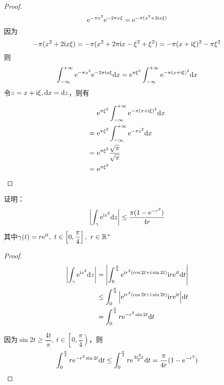 \begin{proof}

    $$\mathrm{e}^{-\pi x^2}\mathrm{e}^{-2\pi x\xi} = \mathrm{e}^{-\pi(x^2 + 2\mathrm{i} x\xi)}$$
    因为
    $$-\pi(x^2 + 2\mathrm{i} x\xi) = -\pi (x^2 + 2\pi\mathrm{i} x - \xi^2 + \xi^2) = -\pi(x + \mathrm{i} \xi)^2 - \pi\xi^2$$
    则
    $$\int_{-\infty}^{+\infty}{\mathrm{e}^{-\pi x^2}\mathrm{e}^{-2\pi \mathrm{i} x\xi}}\mathrm{d} x = \mathrm{e}^{\pi\xi^2} \int_{-\infty}^{+\infty}{\mathrm{e}^{-\pi (x+\mathrm{i}\xi)^2}}\mathrm{d} x$$
    令$z = x + \mathrm{i}\xi, \mathrm{d} x = \mathrm{d} z$，则有

    \begin{align*}
        &\mathrm{e}^{\pi\xi^2} \int_{-\infty}^{+\infty}{\mathrm{e}^{-\pi (x+\mathrm{i}\xi)^2}}\mathrm{d} x \\
        = \ & \mathrm{e}^{\pi\xi^2} \int_{-\infty}^{+\infty}{\mathrm{e}^{-\pi z^2}}\mathrm{d} x \\
        = \ & \mathrm{e}^{\pi\xi^2} \dfrac{\sqrt{\pi}}{\sqrt{\pi}} \\
        = \ & \mathrm{e}^{\pi\xi^2}
    \end{align*}

\end{proof}

\begin{proposition}

    证明：
    $$\left| \int_{\gamma}{\mathrm{e}^{\mathrm{i} z^2}}\mathrm{d} z \right| \leq \dfrac{\pi(1 - \mathrm{e}^{-r^2})}{4r}$$
    其中$\gamma(t) = r\mathrm{e}^{\mathrm{i} t},\ t\in \left[0,\dfrac{\pi}{4} \right],\ r \in \mathbb{R}^+$

\end{proposition}

\begin{proof}

    \begin{align*}
        \left| \int_{\gamma}{\mathrm{e}^{\mathrm{i} z^2}}\mathrm{d} z \right| & = \left| \int_{0}^{\frac{\pi}{4}}{\mathrm{e}^{\mathrm{i} r^2(\cos{2t} + \mathrm{i}\sin{2t})}\mathrm{i} r\mathrm{e}^{\mathrm{i} t}}\mathrm{d} t \right| \\
        & \leq \int_{0}^{\frac{\pi}{4}}{\left| \mathrm{e}^{\mathrm{i} r^2(\cos{2t} + \mathrm{i}\sin{2t})}\mathrm{i} r\mathrm{e}^{\mathrm{i} t} \right|}\mathrm{d} t \\
        & = \int_{0}^{\frac{\pi}{4}}{r\mathrm{e}^{-r^2\sin{2t}}}\mathrm{d} t
    \end{align*}

    因为$\sin{2t} \geq \dfrac{4t}{\pi}, \ t \in \left[0,\dfrac{\pi}{4} \right)$，则
    $$\int_{0}^{\frac{\pi}{4}}{r\mathrm{e}^{-r^2\sin{2t}}}\mathrm{d} t \leq \int_{0}^{\frac{\pi}{4}}{r\mathrm{e}^{\frac{4r^2t}{\pi}}}\mathrm{d} t = \dfrac{\pi}{4r}(1 - \mathrm{e}^{-r^2}) $$

\end{proof}

